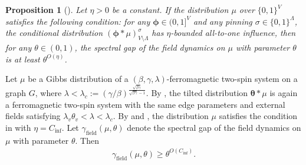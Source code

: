 \documentclass[11pt]{amsart}
\newcommand{\defeq}{:=}
\newtheorem{proposition}[theorem]{Proposition}
\theoremstyle{definition}
\theoremstyle{remark}
\begin{document}
\begin{proposition}[]\label{prop:field-dynamics}
Let $\eta > 0$ be a constant. 
If the distribution $\mu$ over $\{0,1\}^V$ satisfies the following condition: for any $\boldsymbol{\phi} \in (0,1]^V$ and any pinning $\sigma \in \{0,1\}^\Lambda$, the conditional distribution $(\boldsymbol{\phi} * \mu)^\sigma_{V \setminus \Lambda}$ has $\eta$-bounded all-to-one influence, then for any $\theta \in (0,1)$, the spectral gap of the field dynamics on $\mu$ with parameter $\theta$ is at least $\theta^{O(\eta)}$. 
\end{proposition}


Let $\mu$ be a Gibbs distribution of a $(\beta,\gamma,\lambda)$-ferromagnetic two-spin system on a graph $G$, where $\lambda < \lambda_c \defeq (\gamma/\beta)^{\frac{\sqrt{\beta \gamma}}{\sqrt{\beta \gamma}-1}}$.
By , the tilted distribution $\boldsymbol{\theta} * \mu$ is again a ferromagnetic two-spin system with the same edge parameters and external fields satisfying $\lambda_v \theta_v < \lambda < \lambda_c$. By  and , the distribution $\mu$ satisfies the condition in  with $\eta = C_{\text{inf}}$. Let $\gamma_{\text{field}}^{}(\mu,\theta)$ denote the spectral gap of the field dynamics on $\mu$ with parameter $\theta$. Then
\begin{align}\label{eq:gamma-field-theta}
    \gamma_{\text{field}}^{}(\mu,\theta) \geq \theta^{O(C_{\text{inf}})}.
\end{align}
\end{document}
